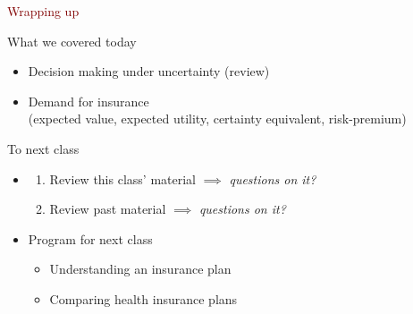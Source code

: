 \begin{frame}{}
    \begin{center}
    \Large \textcolor{maroon}{Wrapping up}
    \end{center}

\end{frame}
\begin{frame}{What we covered today}
        \begin{itemize}
        \item Decision making under uncertainty (review)
        \item Demand for insurance\\
        {\small (expected value, expected utility, certainty equivalent, risk-premium)}
    \end{itemize}
\end{frame}
\begin{frame}{To next class}
    \begin{itemize}
        \item {}
        \begin{enumerate}
            \item Review this class' material $\implies$ \textit{questions on it?}
            \item Review past material $\implies$ \textit{questions on it?}
        \end{enumerate}
        \vspace{5mm}

        \item Program for next class
        \begin{itemize}
            \item Understanding an insurance plan
            \item Comparing health insurance plans
        \end{itemize}
    \end{itemize}
\end{frame}

